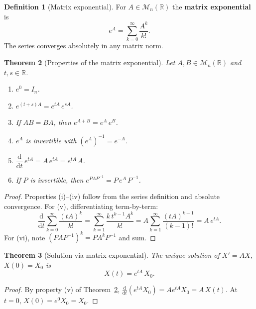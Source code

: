 \documentclass[12pt,a4paper,openany]{book}
\theoremstyle{definition}
\newtheorem{definition}{Definition}[chapter]
\theoremstyle{plain}
\newtheorem{theorem}[definition]{Theorem}
\theoremstyle{remark}
\newcommand{\R}{\mathbb{R}}
\newcommand{\dd}{\mathrm{d}}
\begin{document}
\begin{definition}[Matrix exponential]\label{def:matrix-exp}
For $A\in\mathcal{M}_n(\R)$ the \textbf{matrix exponential} is
\begin{equation}\label{eq:matrix-exp-def}
  e^{A} = \sum_{k=0}^{\infty} \frac{A^k}{k!}.
\end{equation}
The series converges absolutely in any matrix norm.
\end{definition}

\begin{theorem}[Properties of the matrix exponential]\label{thm:exp-properties}
Let $A,B\in\mathcal{M}_n(\R)$ and $t,s\in\R$.
\begin{enumerate}[label=(\roman*)]
  \item $e^{0} = I_n$.
  \item $e^{(t+s)A} = e^{tA}\,e^{sA}$.
  \item If $AB = BA$, then $e^{A+B} = e^{A}\,e^{B}$.
  \item $e^{A}$ is invertible with $(e^{A})^{-1} = e^{-A}$.
  \item $\dfrac{\dd}{\dd t}\,e^{tA} = A\,e^{tA} = e^{tA}\,A$.
  \item If $P$ is invertible, then $e^{PAP^{-1}} = P\,e^{A}\,P^{-1}$.
\end{enumerate}
\end{theorem}

\begin{proof}
Properties (i)--(iv) follow from the series definition and absolute
convergence.  For (v), differentiating term-by-term:
\[
  \frac{\dd}{\dd t}\sum_{k=0}^{\infty}\frac{(tA)^k}{k!}
  = \sum_{k=1}^{\infty}\frac{k\,t^{k-1}A^k}{k!}
  = A\sum_{k=1}^{\infty}\frac{(tA)^{k-1}}{(k-1)!}
  = A\,e^{tA}.
\]
For (vi), note $(PAP^{-1})^k = PA^kP^{-1}$ and sum.
\end{proof}

\begin{theorem}[Solution via matrix exponential]\label{thm:sol-matrix-exp}
The unique solution of $X'=AX$, $X(0)=X_0$ is
\begin{equation}\label{eq:sol-exp}
  X(t) = e^{tA}\,X_0.
\end{equation}
\end{theorem}

\begin{proof}
By property (v) of Theorem~\ref{thm:exp-properties},
$\frac{\dd}{\dd t}(e^{tA}X_0) = Ae^{tA}X_0 = A\,X(t)$.
At $t=0$, $X(0) = e^{0}X_0 = X_0$.
\end{proof}
\end{document}
